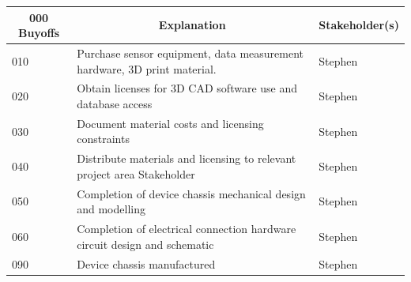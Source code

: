 \documentclass[12pt]{article}
\begin{document}
\begin{table}[H]
  \centering
  \begin{tabular}{|p{2cm}|p{10cm}|p{2cm}|}
  \hline
  \multicolumn{1}{|c|}{\textbf{000 Buyoffs}} & \multicolumn{1}{c|}{\textbf{Explanation}} & \multicolumn{1}{|c|}{\textbf{Stakeholder(s)}}
  \\ \hline
  010
  & Purchase sensor equipment, data measurement hardware, 3D print material.
  & Stephen
  \newline                                
  \\ \hline

  020                              
  & Obtain licenses for 3D CAD software use and database access
  & Stephen
  \newline                                
  \\ \hline

  030                          
  & Document material costs and licensing constraints
  & Stephen
  \newline                                
  \\ \hline

  040                                
  & Distribute materials and licensing to relevant project area Stakeholder
  & Stephen 
  \newline                            
  \\ \hline

  050                                
  & Completion of device chassis mechanical design and modelling
  & Stephen 
  \newline                            
  \\ \hline

  060                                
  & Completion of electrical connection hardware circuit design and schematic
  & Stephen 
  \newline                            
  \\ \hline

  090                                
  & Device chassis manufactured
  & Stephen 
  \newline                            
  \\ \hline

  \end{tabular}
\end{table}
\newpage
\end{document}
